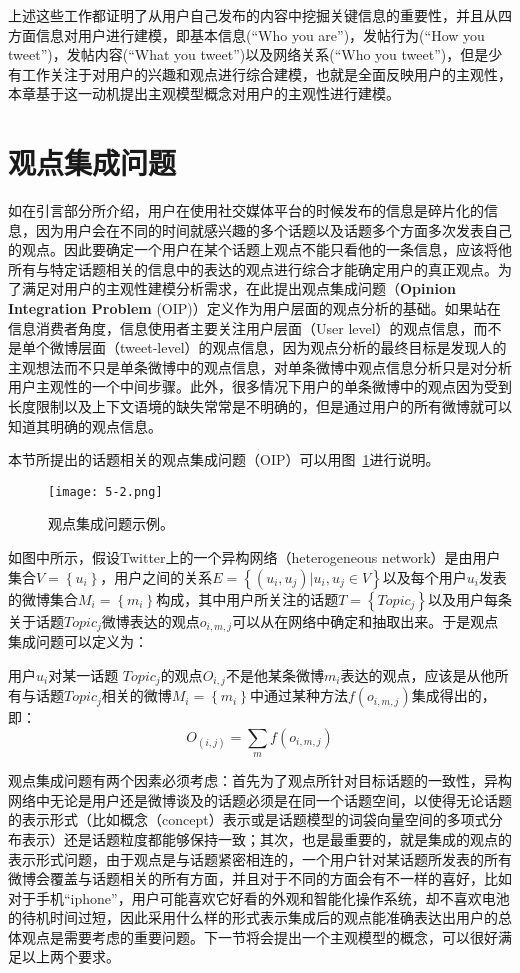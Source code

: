 上述这些工作都证明了从用户自己发布的内容中挖掘关键信息的重要性，并且从四方面信息对用户进行建模，即基本信息(“Who you are”)，发帖行为(“How
you tweet”)，发帖内容(“What you tweet”)以及网络关系(“Who you tweet”)，但是少有工作关注于对用户的兴趣和观点进行综合建模，也就是全面反映用户的主观性，本章基于这一动机提出主观模型概念对用户的主观性进行建模。

\section{观点集成问题}
\label{sec3}
如在引言部分所介绍，用户在使用社交媒体平台的时候发布的信息是碎片化的信息，因为用户会在不同的时间就感兴趣的多个话题以及话题多个方面多次发表自己的观点。因此要确定一个用户在某个话题上观点不能只看他的一条信息，应该将他所有与特定话题相关的信息中的表达的观点进行综合才能确定用户的真正观点。为了满足对用户的主观性建模分析需求，在此提出观点集成问题（\textbf{Opinion Integration Problem} (OIP)）定义作为用户层面的观点分析的基础。如果站在信息消费者角度，信息使用者主要关注用户层面（User level）的观点信息，而不是单个微博层面（tweet-level）的观点信息，因为观点分析的最终目标是发现人的主观想法而不只是单条微博中的观点信息，对单条微博中观点信息分析只是对分析用户主观性的一个中间步骤。此外，很多情况下用户的单条微博中的观点因为受到长度限制以及上下文语境的缺失常常是不明确的，但是通过用户的所有微博就可以知道其明确的观点信息。

本节所提出的话题相关的观点集成问题（OIP）可以用图~\ref{fig5-2}进行说明。
\begin{figure}[htb]
\centering
\texttt{[image: 5-2.png]}
\caption{观点集成问题示例。}
\label{fig5-2}
\end{figure}
如图中所示，假设Twitter上的一个异构网络（heterogeneous network）是由用户集合$ V=\left\{ u_{i} \right\} $，用户之间的关系$ E=\left\{(u_{i},u_{j})| u_{i},u_{j} \in V\right\} $以及每个用户$ u_i $发表的微博集合$ M_{i}=\left\{ m_{i} \right\} $构成，其中用户所关注的话题$ T=\left\{ Topic_{j} \right\} $以及用户每条关于话题$ Topic_{j} $微博表达的观点$ o_{i,m,j} $可以从在网络中确定和抽取出来。于是观点集成问题可以定义为：
\begin{definition}[观点集成问题]
用户$ u_{i} $对某一话题 $ Topic_{j} $的观点$ O_{i,j} $不是他某条微博$ m_{i} $表达的观点，应该是从他所有与话题$ Topic_{j} $相关的微博$ M_{i}=\left\{ m_{i} \right\} $中通过某种方法$ f(o_{i,m,j}) $集成得出的，即：$$ O_(i,j)=\sum_mf(o_{i,m,j})$$
\end{definition}

观点集成问题有两个因素必须考虑：首先为了观点所针对目标话题的一致性，异构网络中无论是用户还是微博谈及的话题必须是在同一个话题空间，以使得无论话题的表示形式（比如概念（concept）表示或是话题模型的词袋向量空间的多项式分布表示）还是话题粒度都能够保持一致；其次，也是最重要的，就是集成的观点的表示形式问题，由于观点是与话题紧密相连的，一个用户针对某话题所发表的所有微博会覆盖与话题相关的所有方面，并且对于不同的方面会有不一样的喜好，比如对于手机“iphone”，用户可能喜欢它好看的外观和智能化操作系统，却不喜欢电池的待机时间过短，因此采用什么样的形式表示集成后的观点能准确表达出用户的总体观点是需要考虑的重要问题。下一节将会提出一个主观模型的概念，可以很好满足以上两个要求。

